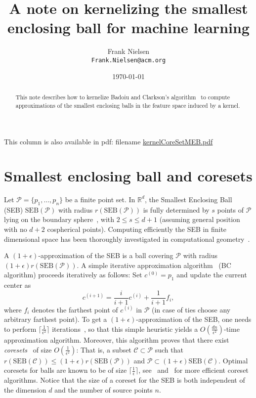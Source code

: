 \documentclass{article}
\title{A note on kernelizing the smallest enclosing ball for machine learning}
\author{Frank Nielsen\\ {\tt Frank.Nielsen@acm.org}}
\date{\today}
\def\calC{\mathcal{C}}
\def\calP{\mathcal{P}}
\def\bbR{\mathbb{R}}
\def\SEB{\mathrm{SEB}}
\def\ceil#1{\lceil #1\rceil}
\def\eps{\epsilon}
\begin{document}
\maketitle

\begin{abstract}
This note describes how to kernelize Badoiu and Clarkson's algorithm~\cite{BC-2003} to compute approximations of the smallest enclosing balls in the feature space induced by a kernel.
\end{abstract}

This column is also available in pdf: filename \url{kernelCoreSetMEB.pdf} 
\vskip 0.5cm

\section{Smallest enclosing ball and coresets}
Let $\calP=\{p_1,\ldots, p_n\}$ be a finite point set.
In $\bbR^{d}$, the Smallest Enclosing Ball (SEB) $\SEB(\calP)$ with radius $r(\SEB(\calP))$ is fully determined by $s$ points of $\calP$ lying on the boundary sphere~\cite{Welzl-1991,Nielsen-2008}, with $2\leq s\leq d+1$ (assuming general position with no $d+2$ cospherical points).
Computing efficiently the SEB in finite dimensional space has been thoroughly investigated in computational geometry~\cite{SEB-1999}.

A $(1+\epsilon)$-approximation of the SEB is a ball covering $\calP$ with radius $(1+\epsilon)r(\SEB(\calP))$.
A simple iterative approximation algorithm~\cite{BC-2003} (BC algorithm) proceeds iteratively as follows: 
Set $c^{(0)}=p_1$ and update the current center as
$$
c^{(i+1)} = \frac{i}{i+1} c^{(i)} + \frac{1}{i+1} f_i,
$$
where $f_i$ denotes the farthest point of $c^{(i)}$ in  $\calP$ (in case of ties choose any arbitrary farthest point).
To get a $(1+\epsilon)$-approximation of the SEB, one needs to perform $\ceil{\frac{1}{\eps^2}}$ iterations~\cite{BC-2003}, so that
this simple heuristic yields a $O(\frac{dn}{\epsilon^2})$-time approximation algorithm.
Moreover, this algorithm proves that there exist {\em coresets}~\cite{BC-2003,Bregball-2005} of size $O(\frac{1}{\epsilon^2})$:
That is, a subset $\calC\subset\calP$ such that $r(\SEB(\calC))\leq (1+\epsilon)r(\SEB(\calP))$ and $\calP\subset (1+\epsilon)\SEB(\calC)$.
Optimal coresets for balls are known to be of size $\ceil{\frac{1}{\epsilon}}$, see~\cite{CoresetBall-2008} and~\cite{kumar-2003,CoresetBall-2008} for more efficient coreset algorithms. Notice that the size of a coreset for the SEB is both independent of the dimension $d$ and the number of source points $n$.
\end{document}

